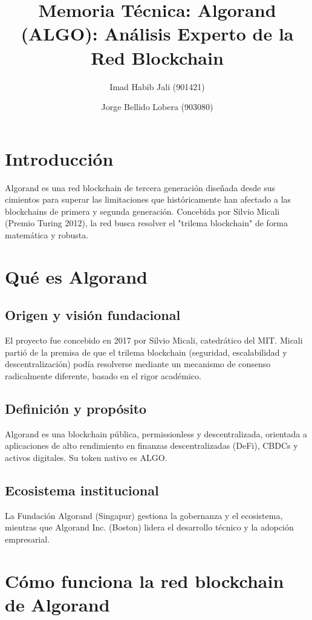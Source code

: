 \documentclass[12pt]{article}
\title{Memoria Técnica: Algorand (ALGO): Análisis Experto de la Red Blockchain}
\author{Imad Habib Jali (901421) \and Jorge Bellido Lobera (903080)}
\date{}
\begin{document}
\maketitle

\section*{Introducción}

Algorand es una red blockchain de tercera generación diseñada desde sus cimientos para superar las limitaciones que históricamente han afectado a las blockchains de primera y segunda generación. Concebida por Silvio Micali (Premio Turing 2012), la red busca resolver el "trilema blockchain" de forma matemática y robusta.

\section{Qué es Algorand}

\subsection{Origen y visión fundacional}
El proyecto fue concebido en 2017 por Silvio Micali, catedrático del MIT. Micali partió de la premisa de que el trilema blockchain (seguridad, escalabilidad y descentralización) podía resolverse mediante un mecanismo de consenso radicalmente diferente, basado en el rigor académico.

\subsection{Definición y propósito}
Algorand es una blockchain pública, permissionless y descentralizada, orientada a aplicaciones de alto rendimiento en finanzas descentralizadas (DeFi), CBDCs y activos digitales. Su token nativo es ALGO.

\subsection{Ecosistema institucional}
La Fundación Algorand (Singapur) gestiona la gobernanza y el ecosistema, mientras que Algorand Inc. (Boston) lidera el desarrollo técnico y la adopción empresarial.

\section{Cómo funciona la red blockchain de Algorand}
\end{document}
